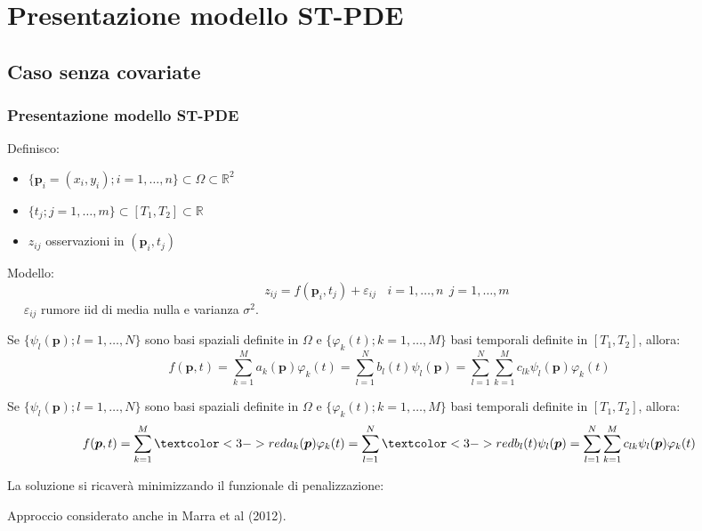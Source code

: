 \documentclass[landscape,9pt]{beamer}                           %
\begin{document}
\section{Presentazione modello ST-PDE}
\subsection{Caso senza covariate}
\begin{frame}
\frametitle{Presentazione modello ST-PDE}
Definisco:
\begin{itemize}
\item $\{\bm{p}_i = (x_i,y_i); i=1, \ldots , n\} \subset \Omega \subset \mathbb{R}^2$
\item $\{t_j ; j=1, \ldots , m\} \subset [T_1,T_2]\subset \mathbb{R}$
\item $z_{ij}$ osservazioni in $(\bm{p}_i,t_j)$
\end{itemize}
\par\bigskip
{}
{
	Modello:
	$$
	z_{ij}=f(\bm{p}_i,t_j)+\varepsilon_{ij}\ \ \ \ i = 1,\ldots,n\ \ j=1,\ldots,m \ \ 
	$$
	\ \ 
	\newline
	$\varepsilon_{ij}$ rumore iid di media nulla e varianza $\sigma^2$.
	
}
{
\par\bigskip
Se $\{ \psi_l(\bm{p});l = 1, \ldots , N \}$ sono basi spaziali definite in $\Omega$ e $\{ \varphi_k(t);k = 1, \ldots , M \}$ basi temporali definite in $[T_1,T_2]$, allora:
	$$
f(\bm{p}, t) = \sum_{k=1}^M a_k(\bm{p})\varphi_k(t) = \sum_{l=1}^N b_l(t)\psi_l(\bm{p}) = \sum_{l=1}^N 	\sum_{k=1}^M c_{lk}\psi_l(\bm{p})\varphi_k(t)
	$$
}
\end{frame}


\begin{frame}
Se $\{ \psi_l(\bm{p});l = 1, \ldots , N \}$ sono basi spaziali definite in $\Omega$ e $\{ \varphi_k(t);k = 1, \ldots , M \}$ basi temporali definite in $[T_1,T_2]$, allora:
	$$
f(\bm{p}, t) = \sum_{k=1}^M \textcolor<3->{red}{a_k(\bm{p})}\varphi_k(t) = \sum_{l=1}^N \textcolor<3->{red}{b_l(t)}\psi_l(\bm{p}) = \sum_{l=1}^N 	\sum_{k=1}^M c_{lk}\psi_l(\bm{p})\varphi_k(t)
	$$

La soluzione si ricaverà minimizzando il funzionale di penalizzazione:
\uncover<3->
{
\par\bigskip
Approccio considerato anche in Marra et al (2012).
}
\end{frame}
\end{document}

